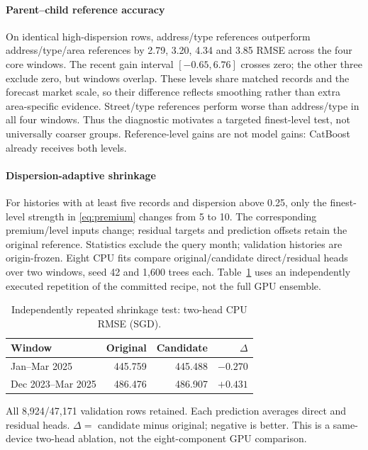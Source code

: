 \documentclass[conference]{IEEEtran}
\begin{document}
\paragraph{Parent--child reference accuracy}
On identical high-dispersion rows, address/type references outperform address/type/area references by 2.79, 3.20, 4.34 and 3.85 RMSE across the four core windows. The recent gain interval $[-0.65,6.76]$ crosses zero; the other three exclude zero, but windows overlap. These levels share matched records and the forecast market scale, so their difference reflects smoothing rather than extra area-specific evidence. Street/type references perform worse than address/type in all four windows. Thus the diagnostic motivates a targeted finest-level test, not universally coarser groups. Reference-level gains are not model gains: CatBoost already receives both levels.

\paragraph{Dispersion-adaptive shrinkage}
For histories with at least five records and dispersion above 0.25, only the finest-level strength in \eqref{eq:premium} changes from 5 to 10. The corresponding premium/level inputs change; residual targets and prediction offsets retain the original reference. Statistics exclude the query month; validation histories are origin-frozen. Eight CPU fits compare original/candidate direct/residual heads over two windows, seed 42 and 1,600 trees each. Table~\ref{tab:dispersion-shrinkage} uses an independently executed repetition of the committed recipe, not the full GPU ensemble.

\begin{table}[!tb]
\caption{Independently repeated shrinkage test: two-head CPU RMSE (SGD).}
\label{tab:dispersion-shrinkage}\centering\footnotesize
\begin{tabular}{lrrr}
\toprule Window & Original & Candidate & $\Delta$ \\
\midrule
Jan--Mar 2025 & 445.759 & 445.488 & $-0.270$ \\
Dec 2023--Mar 2025 & 486.476 & 486.907 & $+0.431$ \\
\bottomrule
\end{tabular}
\par\smallskip\raggedright\footnotesize All 8,924/47,171 validation rows retained. Each prediction averages direct and residual heads. $\Delta=$ candidate minus original; negative is better. This is a same-device two-head ablation, not the eight-component GPU comparison.
\end{table}
\end{document}
